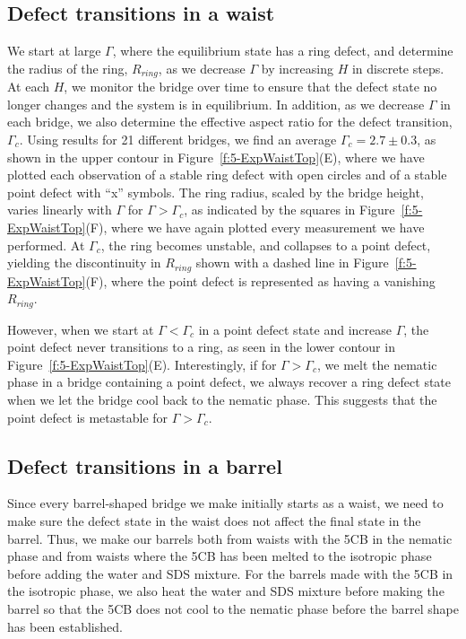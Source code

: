 \subsection{Defect transitions in a waist}
We start at large $\Gamma$, where the equilibrium state has a ring defect, and determine the radius of the ring, $R_{ring}$, as we decrease $\Gamma$ by increasing $H$ in discrete steps.
At each $H$, we monitor the bridge over time to ensure that the defect state no longer changes and the system is in equilibrium.
In addition, as we decrease $\Gamma$ in each bridge, we also determine the effective aspect ratio for the defect transition, $\Gamma_c$.
Using results for 21 different bridges, we find an average $\Gamma_c = 2.7 \pm 0.3$, as shown in the upper contour in Figure~\ref{f:5-ExpWaistTop}(E), where we have plotted each observation of a stable ring defect with open circles and of a stable point defect with ``x'' symbols.
The ring radius, scaled by the bridge height, varies linearly with $\Gamma$ for $\Gamma > \Gamma_c$, as indicated by the squares in Figure~\ref{f:5-ExpWaistTop}(F), where we have again plotted every measurement we have performed.
At $\Gamma_c$, the  ring becomes unstable, and collapses to a point defect, yielding the discontinuity in $R_{ring}$ shown with a dashed line in Figure~\ref{f:5-ExpWaistTop}(F), where the point defect is represented as having a vanishing $R_{ring}$.

However, when we start at $\Gamma < \Gamma_c$ in a point defect state and increase $\Gamma$, the point defect never transitions to a ring, as seen in the lower contour in Figure~\ref{f:5-ExpWaistTop}(E).
Interestingly, if for $\Gamma > \Gamma_c$, we melt the nematic phase in a bridge containing a point defect, we always  recover a ring defect state when we let the bridge cool back to the nematic phase.
This suggests that the point defect is metastable for $\Gamma > \Gamma_c$.


\subsection{Defect transitions in a barrel}
Since every barrel-shaped bridge we make initially starts as a waist, we need to make sure the defect state in the waist does not affect the final state in the barrel.
Thus, we make our barrels both from waists with the 5CB in the nematic phase and from waists where the 5CB has been melted to the isotropic phase before adding the water and SDS mixture.
For the barrels made with the 5CB in the isotropic phase, we also heat the water and SDS mixture before making the barrel so that the 5CB does not cool to the nematic phase before the barrel shape has been established.

